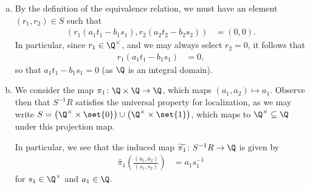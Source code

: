 \documentclass[10pt]{mypackage}
\begin{document}
\begin{solution}\hfill
  \begin{enumerate}[(a)]
    \item By the definition of the equivalence relation, we must have an element $\left( r_1,r_2 \right)\in S$ such that
      \begin{align*}
        \left( r_1\left( a_1t_1-b_1s_1 \right),r_2\left( a_2t_2-b_2s_2 \right) \right) &= \left( 0,0 \right).
      \end{align*}
      In particular, since $r_1\in \Q^{\times}$, and we may always select $r_2 = 0$, it follows that
      \begin{align*}
        r_1\left( a_1t_1-b_1s_1 \right) &= 0,
      \end{align*}
      so that $a_1t_1 - b_1s_1 = 0$ (as $\Q$ is an integral domain).
    \item We consider the map $\pi_1\colon \Q\times \Q\rightarrow \Q$, which maps $\left( a_1,a_2 \right)\mapsto a_1$. Observe then that $S^{-1}R$ satisfies the universal property for localization, as we may write $S = \left( \Q^{\times}\times \set{0} \right)\cup \left( \Q^{\times}\times \set{1} \right)$, which maps to $\Q^{\times}\subseteq \Q$ under this projection map.\newline

      In particular, we see that the induced map $\widetilde{\pi_1}\colon S^{-1}R\rightarrow \Q$ is given by
      \begin{align*}
        \widetilde{\pi_1} \left( \frac{\left( a_1,a_2 \right)}{\left( s_1,s_2 \right)} \right) &= a_1s_1^{-1}
      \end{align*}
      for $s_1\in \Q^{\times}$ and $a_1\in \Q$.\newline


\end{enumerate}
\end{solution}
\end{document}
